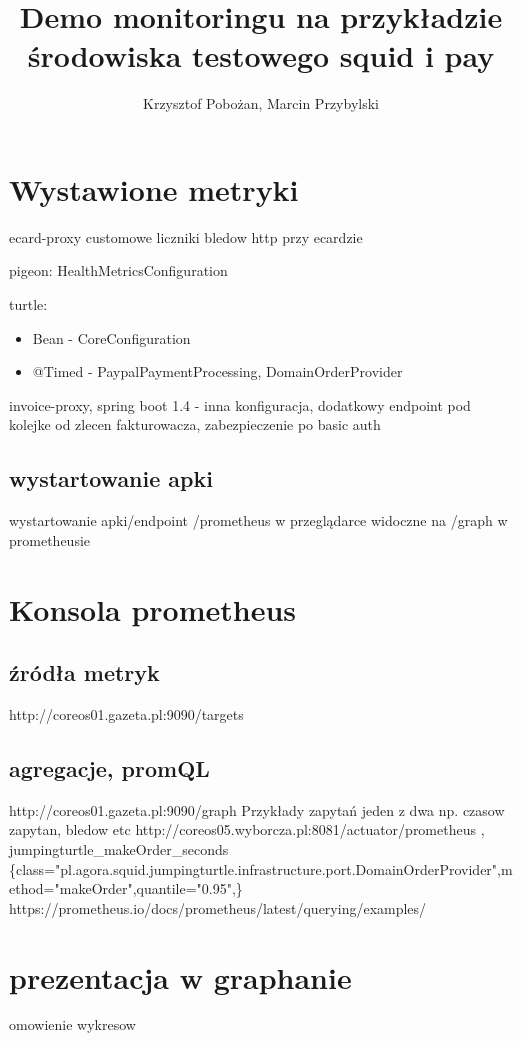 \documentclass[12pt,a4paper,notitlepage,onecolumn]{article}
\author{Krzysztof Pobożan, Marcin Przybylski}
\title{Demo monitoringu na przykładzie środowiska testowego squid i pay}
\begin{document}
	\maketitle
	
	
	\section{Wystawione metryki}
	ecard-proxy customowe liczniki bledow http przy ecardzie
	
	pigeon: HealthMetricsConfiguration
	
	turtle:
		\begin{itemize}
			\item Bean - CoreConfiguration
			\item @Timed - PaypalPaymentProcessing, DomainOrderProvider
		\end{itemize}
	
	
	invoice-proxy, spring boot 1.4 - inna konfiguracja, dodatkowy endpoint pod kolejke od zlecen fakturowacza, zabezpieczenie po basic auth
	
	\subsection{wystartowanie apki}
	wystartowanie apki/endpoint /prometheus w przeglądarce
	widoczne na /graph w prometheusie
	

	
	\section{Konsola prometheus}
	
	\subsection{źródła metryk}
	http://coreos01.gazeta.pl:9090/targets
	\subsection{agregacje, promQL}
	http://coreos01.gazeta.pl:9090/graph
	Przykłady zapytań jeden z dwa np. czasow zapytan, bledow etc	
	http://coreos05.wyborcza.pl:8081/actuator/prometheus , jumpingturtle\_makeOrder\_seconds \{class="pl.agora.squid.jumpingturtle.infrastructure.port.DomainOrderProvider",method="makeOrder",quantile="0.95",\}\\
	https://prometheus.io/docs/prometheus/latest/querying/examples/
	\section{prezentacja w graphanie}
		omowienie wykresow
	
\end{document}
